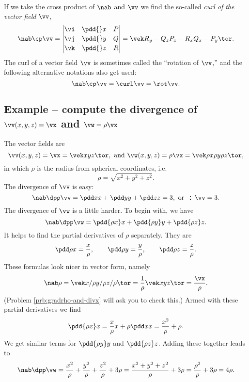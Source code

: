 If we take the cross product of $\nab$ and $\vv$ we find the so-called
\emph{curl of the vector field} $\vv$,
\[
\nab \cp \vv = \left|
  \begin{matrix}
    \vi & \pdd{}x & P \\[2pt]
    \vj & \pdd{}y & Q \\[2pt]
    \vk & \pdd{}z & R
  \end{matrix}
\right| =\vek R_y - Q_z\\ P_z - R_x \\ Q_x - P_y\tor.
\]
The curl of a vector field $\vv$ is sometimes called the ``rotation of $\vv$,''
and the following alternative notations also get used:
\[
\nab \cp \vv = \curl \vv = \rot \vv.
\]

\subsection{Example -- compute the divergence of $\vv(x, y, z) = \vx$ and $\vw =
  \rho\vx$}
\label{sec:divx-and-divrhox}
The vector fields are
\[
\vv(x, y, z) = \vx = \vek x\\y\\z\tor, \text{ and } \vw(x, y, z) = \rho\vx =
\vek \rho x\\\rho y \\ \rho z\tor,
\]
in which $\rho$ is the radius from spherical coordinates, i.e.
\[
\rho = \sqrt{x^2+y^2+z^2}.
\]
The divergence of $\vv$ is easy:
\[
\nab\dpp\vv = \pdd xx + \pdd yy + \pdd zz = 3, \text{ or } \div \vv =3.
\]
The divergence of $\vw$ is a little harder.  To begin with, we have
\[
\nab\dpp\vw = \pdd{\rho x}x + \pdd{\rho y}y + \pdd{\rho z}z.
\]
It helps to find the partial derivatives of $\rho$ separately.  They are
\[
\pdd \rho x = \frac{x} {\rho},\qquad \pdd \rho y = \frac{y} {\rho},\qquad \pdd
\rho z = \frac{z} {\rho}.
\]
These formulas look nicer in vector form, namely
\begin{equation}\label{eq:05gradient-of-rho}
  \nab \rho = \vek x/\rho\\y/\rho\\z/\rho\tor
  =\frac{1} {\rho}\vek x\\y\\z\tor = \frac{\vx} {\rho}.
\end{equation}
(Problem \ref{prb:gradrho-and-divx} will ask you to check this.)  Armed with
these partial derivatives we find
\[
\pdd{\rho x}x = \frac{x} {\rho}x + \rho \pdd xx = \frac{x^2} {\rho} + \rho.
\]
We get similar terms for $\pdd{\rho y}y$ and $\pdd{\rho z}z$.  Adding these
together leads to
\[
\nab\dpp\vw = \frac{x^2} {\rho} +\frac{y^2} {\rho} +\frac{z^2} {\rho} +3\rho =
\frac{x^2 + y^2 + z^2} {\rho} +3\rho = \frac{\rho^2} {\rho} + 3\rho = 4\rho.
\]

